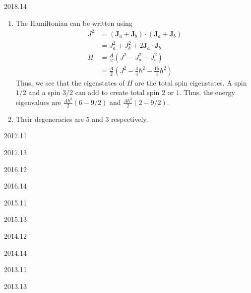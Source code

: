 \documentclass[12pt]{article}
\begin{document}
\begin{solution}{2018.14}
  \begin{enumerate}
    \item The Hamiltonian can be written using
    \begin{align*}
      J^2 & = (\mathbf{J}_a + \mathbf{J}_b) \cdot (\mathbf{J}_a + \mathbf{J}_b) \\
      & = J_a^2 + J_b^2 + 2 \mathbf{J}_a \cdot \mathbf{J}_b \\
      H & = \frac{A}{2} (J^2 - J_a^2 - J_b^2) \\
      & = \frac{A}{2} \left( J^2 - \frac{3}{4} \hbar^2 - \frac{15}{4} \hbar^2 \right)
    \end{align*}
    Thus, we see that the eigenstates of $H$ are the total spin eigenstates.
    A spin $1/2$ and a spin $3/2$ can add to create total spin $2$ or $1$.
    Thus, the energy eigenvalues are $\frac{A \hbar^2}{2} (6 - 9/2)$ and $\frac{A \hbar^2}{2} (2 - 9/2)$.

    \item Their degeneracies are $5$ and $3$ respectively.
  \end{enumerate}
\end{solution}


\begin{solution}{2017.11}

\end{solution}


\begin{solution}{2017.13}

\end{solution}


\begin{solution}{2016.12}

\end{solution}


\begin{solution}{2016.14}

\end{solution}


\begin{solution}{2015.11}

\end{solution}


\begin{solution}{2015.13}

\end{solution}


\begin{solution}{2014.12}

\end{solution}


\begin{solution}{2014.14}

\end{solution}


\begin{solution}{2013.11}

\end{solution}


\begin{solution}{2013.13}

\end{solution}
\end{document}
